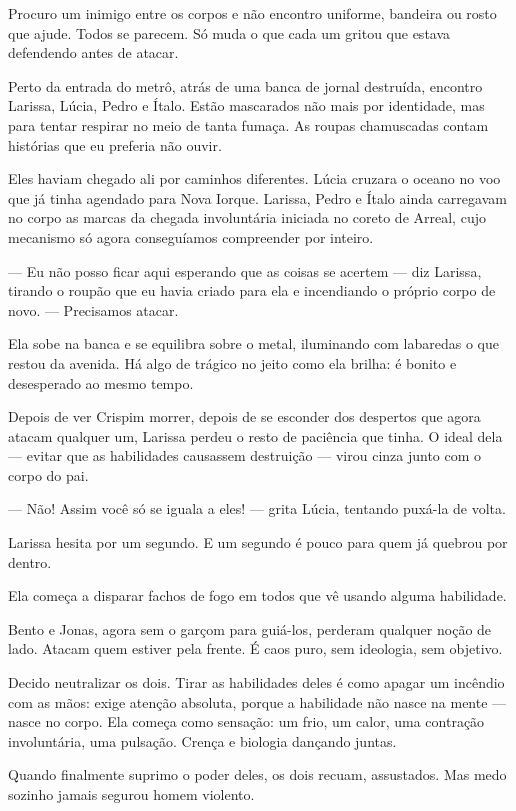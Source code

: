 Procuro um inimigo entre os corpos e não encontro uniforme, bandeira ou rosto que ajude. Todos se parecem. Só muda o que cada um gritou que estava defendendo antes de atacar.

\bigskip

Perto da entrada do metrô, atrás de uma banca de jornal destruída, encontro Larissa, Lúcia, Pedro e Ítalo. Estão mascarados não mais por identidade, mas para tentar respirar no meio de tanta fumaça. As roupas chamuscadas contam histórias que eu preferia não ouvir.

Eles haviam chegado ali por caminhos diferentes. Lúcia cruzara o oceano no voo que já tinha agendado para Nova Iorque. Larissa, Pedro e Ítalo ainda carregavam no corpo as marcas da chegada involuntária iniciada no coreto de Arreal, cujo mecanismo só agora conseguíamos compreender por inteiro.

— Eu não posso ficar aqui esperando que as coisas se acertem — diz Larissa, tirando o roupão que eu havia criado para ela e incendiando o próprio corpo de novo. — Precisamos atacar.

Ela sobe na banca e se equilibra sobre o metal, iluminando com labaredas o que restou da avenida. Há algo de trágico no jeito como ela brilha: é bonito e desesperado ao mesmo tempo.

Depois de ver Crispim morrer, depois de se esconder dos despertos que agora atacam qualquer um, Larissa perdeu o resto de paciência que tinha. O ideal dela — evitar que as habilidades causassem destruição — virou cinza junto com o corpo do pai.

— Não! Assim você só se iguala a eles! — grita Lúcia, tentando puxá-la de volta.

Larissa hesita por um segundo. E um segundo é pouco para quem já quebrou por dentro.

Ela começa a disparar fachos de fogo em todos que vê usando alguma habilidade.

\bigskip

Bento e Jonas, agora sem o garçom para guiá-los, perderam qualquer noção de lado. Atacam quem estiver pela frente. É caos puro, sem ideologia, sem objetivo.

Decido neutralizar os dois. Tirar as habilidades deles é como apagar um incêndio com as mãos: exige atenção absoluta, porque a habilidade não nasce na mente — nasce no corpo. Ela começa como sensação: um frio, um calor, uma contração involuntária, uma pulsação. Crença e biologia dançando juntas.

Quando finalmente suprimo o poder deles, os dois recuam, assustados. Mas medo sozinho jamais segurou homem violento.

